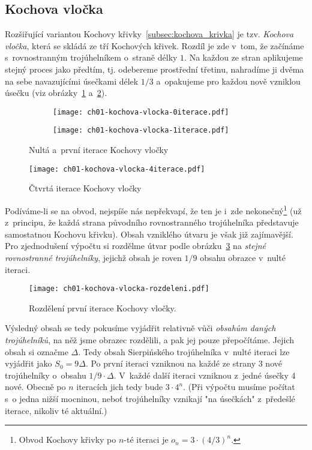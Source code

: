 \subsection{Kochova vločka}\label{subsec:kochova_vlocka}
Rozšiřující variantou Kochovy křivky~\ref{subsec:kochova_krivka} je tzv. \emph{Kochova vločka}, která se skládá ze tří Kochových křivek. Rozdíl je zde v~tom, že začínáme s~rovnostranným trojúhelníkem o~straně délky $1$. Na každou ze stran aplikujeme stejný proces jako předtím, tj. odebereme prostřední třetinu, nahradíme ji dvěma na sebe navazujícími úsečkami délek $1/3$ a~opakujeme pro každou nově vzniklou úsečku (viz obrázky~\ref{fig:kochova_vlocka_dve_iterace} a~\ref{fig:kochova_krivka_5iterace}).
\begin{figure}[h]
    \centering
    \begin{subfigure}{\subfigwidth}
        \centering
        \texttt{[image: ch01-kochova-vlocka-0iterace.pdf]}
    \end{subfigure}
    \qquad
    \begin{subfigure}{\subfigwidth}
        \centering
        \texttt{[image: ch01-kochova-vlocka-1iterace.pdf]}
    \end{subfigure}
    \caption{Nultá a~první iterace Kochovy vločky}
    \label{fig:kochova_vlocka_dve_iterace}
\end{figure}
\begin{figure}[h]
    \centering
    \texttt{[image: ch01-kochova-vlocka-4iterace.pdf]}
    \caption{Čtvrtá iterace Kochovy vločky}
    \label{fig:kochova_krivka_5iterace}
\end{figure}
Podíváme-li se na obvod, nejspíše nás nepřekvapí, že ten je i~zde nekonečný\footnote{Obvod Kochovy křivky po $n$-té iteraci je $o_n=3\cdot(4/3)^{n}$.} (už z~principu, že každá strana původního rovnostranného trojúhelníka představuje samostatnou Kochovu křivku).
Obsah vzniklého útvaru je však již zajímavější. Pro zjednodušení výpočtu si rozdělme útvar podle obrázku~\ref{fig:kochova_vlocka_rozdeleni} na \emph{stejné rovnostranné trojúhelníky}, jejichž obsah je roven $1/9$ obsahu obrazce v~nulté iteraci.
\begin{figure}[h]
    \centering
    \texttt{[image: ch01-kochova-vlocka-rozdeleni.pdf]}
    \caption{Rozdělení první iterace Kochovy vločky.}
    \label{fig:kochova_vlocka_rozdeleni}
\end{figure}
Výsledný obsah se tedy pokusíme vyjádřit relativně vůči \emph{obsahům daných trojúhelníků}, na něž jsme obrazec rozdělili, a pak jej pouze přepočítáme. Jejich obsah si označme $\Delta$. Tedy obsah Sierpińského trojúhelníka v~nulté iteraci lze vyjádřit jako $S_0=9\Delta$. Po první iteraci vzniknou na každé ze strany 3 nové trojúhelníky o~obsahu $1/9\cdot\Delta$. V~každé další iteraci vzniknou z~jedné úsečky 4 nové. Obecně po $n$ iteracích jich tedy bude $3\cdot 4^{n}$. (Při výpočtu musíme počítat s~o jedna nižší mocninou, neboť trojúhelníky vznikají "na úsečkách" z~předešlé iterace, nikoliv té aktuální.)\par

